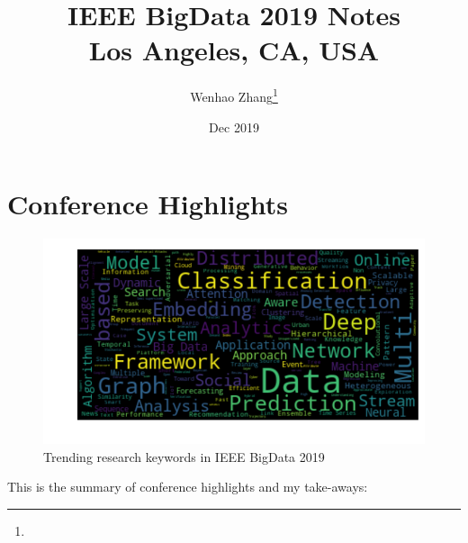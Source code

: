 \documentclass[11pt]{article}
\title{IEEE BigData 2019 Notes \\ \Large{Los Angeles, CA, USA}}
\author{Wenhao Zhang\footnote{\durl{http://wenhaoz.io}} \\ \durl{wenhaoz@ucla.edu}}
\date{Dec 2019}
\begin{document}
\maketitle
\tableofcontents
\newpage



\section{Conference Highlights}
\begin{figure}[ht!]
    \centering
    \includegraphics[width=140mm]{images/wordcloud.png}
    \caption{Trending research keywords in IEEE BigData 2019}
    \label{fig:my_label}
\end{figure}{}

This is the summary of conference highlights and my take-aways:
\end{document}
